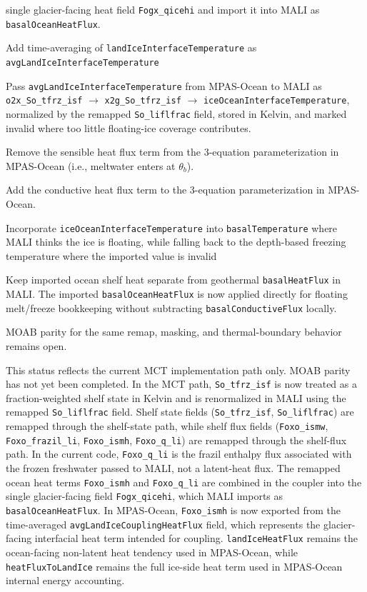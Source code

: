 \documentclass[11pt]{report}
\newcommand{\cmark}{\ding{51}}%
\newcommand{\done}{\rlap{$\square$}{\raisebox{2pt}{\large\hspace{1pt}\cmark}}%
\hspace{-2.5pt}}
\begin{document}
\begin{todolist}
    single glacier-facing heat field \texttt{Fogx\_qicehi} and import it into MALI as
    \texttt{basalOceanHeatFlux}.
    \item[\done] Add time-averaging of \texttt{landIceInterfaceTemperature} as \texttt{avgLandIceInterfaceTemperature}
    \item[\done] Pass \texttt{avgLandIceInterfaceTemperature} from MPAS-Ocean to MALI as
    \texttt{o2x\_So\_tfrz\_isf} $\rightarrow$ \texttt{x2g\_So\_tfrz\_isf}
    $\rightarrow$ \texttt{iceOceanInterfaceTemperature}, normalized by the remapped
    \texttt{So\_liflfrac} field, stored in Kelvin, and marked invalid where too
    little floating-ice coverage contributes.
    \item[\done] Remove the sensible heat flux term from the 3-equation parameterization in MPAS-Ocean (i.e., meltwater enters at $\theta_b$).
    \item[\done] Add the conductive heat flux term to the 3-equation parameterization in MPAS-Ocean.
    \item[\done] Incorporate \texttt{iceOceanInterfaceTemperature} into
    \texttt{basalTemperature} where MALI thinks the ice is floating, while falling
    back to the depth-based freezing temperature where the imported value is invalid
    \item[\done] Keep imported ocean shelf heat separate from geothermal
    \texttt{basalHeatFlux} in MALI.  The imported \texttt{basalOceanHeatFlux} is now
    applied directly for floating melt/freeze bookkeeping without subtracting
    \texttt{basalConductiveFlux} locally.
    \item MOAB parity for the same remap, masking, and thermal-boundary behavior remains
    open.
\end{todolist}

This status reflects the current MCT implementation path only.  MOAB parity has not
yet been completed.  In the MCT path, \texttt{So\_tfrz\_isf} is now treated as a
fraction-weighted shelf state in Kelvin and is renormalized in MALI using the
remapped \texttt{So\_liflfrac} field.  Shelf state fields
(\texttt{So\_tfrz\_isf}, \texttt{So\_liflfrac}) are remapped through the shelf-state
path, while shelf flux fields (\texttt{Foxo\_ismw}, \texttt{Foxo\_frazil\_li},
\texttt{Foxo\_ismh}, \texttt{Foxo\_q\_li}) are remapped through the shelf-flux path.
In the current code, \texttt{Foxo\_q\_li} is the frazil enthalpy flux associated with
the frozen freshwater passed to MALI, not a latent-heat flux.  The remapped
ocean heat terms \texttt{Foxo\_ismh} and \texttt{Foxo\_q\_li} are combined in the
coupler into the single glacier-facing field \texttt{Fogx\_qicehi}, which MALI
imports as \texttt{basalOceanHeatFlux}.  In MPAS-Ocean, \texttt{Foxo\_ismh} is now
exported from the time-averaged \texttt{avgLandIceCouplingHeatFlux} field, which
represents the glacier-facing interfacial heat term intended for coupling.
\texttt{landIceHeatFlux} remains the ocean-facing non-latent heat tendency used in
MPAS-Ocean, while \texttt{heatFluxToLandIce} remains the full ice-side heat term
used in MPAS-Ocean internal energy accounting.
\end{document}
